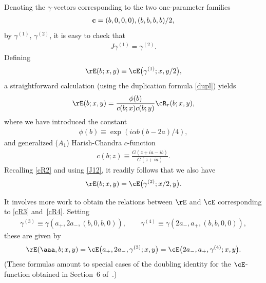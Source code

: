 \documentclass[pdftex]{sigma}
\numberwithin{equation}{section}
\begin{document}
Denoting the $\gamma$-vectors corresponding to the two one-parameter families
\begin{gather}
{\bf c}=(b,0,0,0), (b,b,b,b)/2,
\end{gather}
by $\gamma^{(1)}$,  $\gamma^{(2)}$, it is easy to check that
\begin{gather}\label{J12}
J\gamma^{(1)}=\gamma^{(2)}.
\end{gather}
Def\/ining
\begin{gather}\label{EcE}
\rE(b;x,y)\equiv \cE\big(\gamma^{(1)};x,y/2\big),
\end{gather}
a straightforward calculation (using the duplication formula \eqref{dupl}) yields
\begin{gather}\label{ER}
\rE(b;x,y)=\frac{\phi(b)}{c(b;x)c(b;y)}\cR_r(b;x,y),
\end{gather}
where we have introduced the constant
\begin{gather}\label{phib}
\phi(b)\equiv \exp(i\alpha b(b-2a)/4),
\end{gather}
and generalized ($A_1$) Harish-Chandra $c$-function
\begin{gather}\label{cb}
c(b;z)\equiv \frac{G(z+ia-ib)}{G(z+ia)}.
\end{gather}
Recalling \eqref{cR2} and using \eqref{J12}, it readily follows that we also have
\begin{gather}
\rE(b;x,y)=\cE\big(\gamma^{(2)};x/2,y\big).
\end{gather}

It involves more work to obtain the relations between $\rE$ and $\cE$ corresponding to \eqref{cR3} and~\eqref{cR4}. Setting
\begin{gather}
\gamma^{(3)}\equiv \gamma(a_{+},2a_{-},(b,0,b,0)),\qquad \gamma^{(4)}\equiv \gamma(2a_{-},a_{+},(b,b,0,0)),
\end{gather}
these are given by
\begin{gather}
\rE(\aaa,b;x,y)=\cE\big(a_{+},2a_{-},\gamma^{(3)};x,y\big)=\cE\big(2a_{-},a_{+},\gamma^{(4)};x,y\big).
\end{gather}
(These formulas amount to special cases of the doubling identity for the $\cE$-function obtained in Section~6 of~\cite{quad}.)
\end{document}
